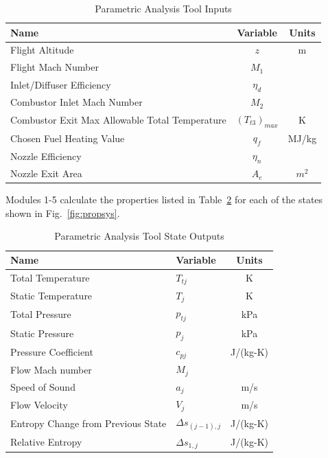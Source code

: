 \documentclass[conf]{new-aiaa} %
\begin{document}
\begin{table}[H] %
    \caption{\label{tab:tool_inputs} Parametric Analysis Tool Inputs}
    \centering
    \begin{tabular}{lcc}
        \hline
        Name& Variable& Units\\\hline
        Flight Altitude& $z$& m\\
        Flight Mach Number& $M_1$\\
        Inlet/Diffuser Efficiency& $\eta_d$\\
        Combustor Inlet Mach Number& $M_2$\\
        Combustor Exit Max Allowable Total Temperature& $(T_{t3})_{max}$& K\\
        Chosen Fuel Heating Value& $q_f$& MJ/kg\\
        Nozzle Efficiency& $\eta_n$\\
        Nozzle Exit Area& $A_e$& $m^2$\\
        \hline
    \end{tabular}
\end{table}

Modules 1-5 calculate the properties listed in Table~\ref{tab:state_outputs} for each of the states shown in Fig.~\ref{fig:propsys}.

\begin{table}[H] %
    \caption{\label{tab:state_outputs} Parametric Analysis Tool State Outputs}
    \centering
    \begin{tabular}{llc}
        \hline
        Name& Variable& Units\\\hline
        Total Temperature& $T_{tj}$& K\\
        Static Temperature& $T_{j}$& K\\
        Total Pressure& $p_{tj}$& kPa\\
        Static Pressure& $p_j$& kPa\\
        Pressure Coefficient& $c_{pj}$& J/(kg-K)\\
        Flow Mach number& $M_j$\\
        Speed of Sound& $a_j$& m/s\\
        Flow Velocity& $V_j$& m/s\\
        Entropy Change from Previous State& $\Delta s_{(j-1),j}$& J/(kg-K)\\
        Relative Entropy& $\Delta s_{1,j}$& J/(kg-K)\\
        \hline
    \end{tabular}
\end{table}
\end{document}

